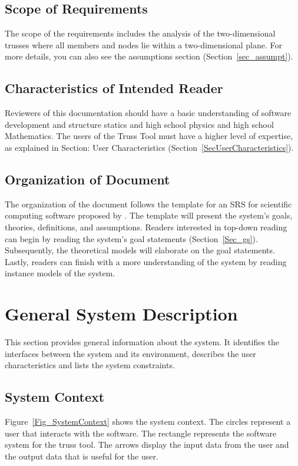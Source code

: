 \documentclass[12pt]{article}
\begin{document}
\subsection{Scope of Requirements} 
{The scope of the requirements includes the analysis of the two-dimensional trusses where all members and nodes lie within a two-dimensional plane. For more details, you can also see the assumptions section  (Section~\ref{sec_assumpt}). }

\subsection{Characteristics of Intended Reader} \label{sec_IntendedReader}
Reviewers of this documentation should have a basic understanding of software development and structure statics and high school physics and high school Mathematics.  The users of the Truss Tool must have a higher level of expertise, as explained in Section: User Characteristics (Section~\ref{SecUserCharacteristics}). 

\subsection{Organization of Document}
The organization of the document follows the template for an SRS for scientific computing software proposed by \citet{SmithandLai2005}. The template will present the system's goals, theories, definitions, and assumptions. Readers interested in top-down reading can begin by reading the system's goal statements (Section~\ref{Sec_gs}). Subsequently, the theoretical models will elaborate on the goal statements. Lastly, readers can finish with a more  understanding of the system by reading instance models of the system.

\section{General System Description}

This section provides general information about the system.  It identifies the interfaces between the system and its environment, describes the user characteristics and lists the system constraints. 

\subsection{System Context}
Figure~\ref{Fig_SystemContext} shows the system context. The circles 
represent a user that interacts with the software. The rectangle represents the software system for the truss tool. The arrows display the input data from the user and the output data that is useful for the user.
\end{document}
